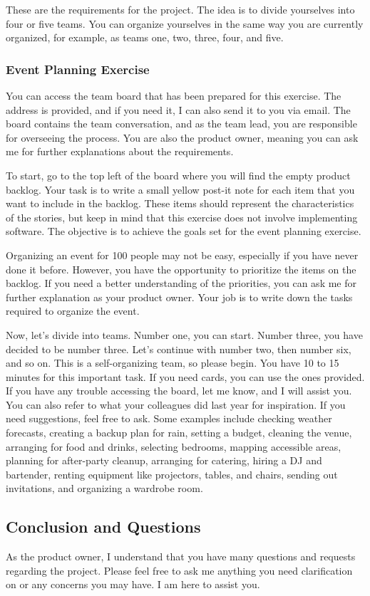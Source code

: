 These are the requirements for the project. The idea is to divide
yourselves into four or five teams. You can organize yourselves in the
same way you are currently organized, for example, as teams one, two,
three, four, and five.

\subsubsection{Event Planning Exercise}

You can access the team board that has been prepared for this exercise.
The address is provided, and if you need it, I can also send it to you
via email. The board contains the team conversation, and as the team
lead, you are responsible for overseeing the process. You are also the
product owner, meaning you can ask me for further explanations about the
requirements.

To start, go to the top left of the board where you will find the empty
product backlog. Your task is to write a small yellow post-it note for
each item that you want to include in the backlog. These items should
represent the characteristics of the stories, but keep in mind that this
exercise does not involve implementing software. The objective is to
achieve the goals set for the event planning exercise.

Organizing an event for 100 people may not be easy, especially if you
have never done it before. However, you have the opportunity to
prioritize the items on the backlog. If you need a better understanding
of the priorities, you can ask me for further explanation as your
product owner. Your job is to write down the tasks required to organize
the event.

Now, let's divide into teams. Number one, you can start. Number three,
you have decided to be number three. Let's continue with number two,
then number six, and so on. This is a self-organizing team, so please
begin. You have 10 to 15 minutes for this important task. If you need
cards, you can use the ones provided. If you have any trouble accessing
the board, let me know, and I will assist you. You can also refer to
what your colleagues did last year for inspiration. If you need
suggestions, feel free to ask. Some examples include checking weather
forecasts, creating a backup plan for rain, setting a budget, cleaning
the venue, arranging for food and drinks, selecting bedrooms, mapping
accessible areas, planning for after-party cleanup, arranging for
catering, hiring a DJ and bartender, renting equipment like projectors,
tables, and chairs, sending out invitations, and organizing a wardrobe
room.

\subsection{Conclusion and Questions}

As the product owner, I understand that you have many questions and
requests regarding the project. Please feel free to ask me anything you
need clarification on or any concerns you may have. I am here to assist
you.